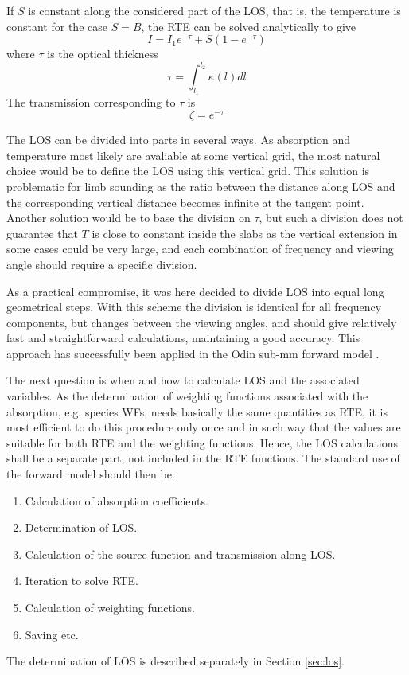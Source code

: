  If $S$ is constant along the considered part of the LOS, that is, the
 temperature is constant for the case $S=B$, the RTE can be solved
 analytically to give
 \begin{equation}
   I = I_1e^{-\tau} + S\left(1-e^{-\tau}\right)
  \label{eq:rte:step}
 \end{equation}
 where $\tau$ is the optical thickness
 \begin{equation}
   \tau = \int_{l_1}^{l_2}{\kappa(l)dl}
 \end{equation}
 The transmission corresponding to $\tau$ is
 \begin{equation}
   \zeta = e^{-\tau}
 \end{equation}  



 \label{sec:rte:practical}
 
 The LOS can be divided into parts in several ways. As absorption and
 temperature most likely are avaliable at some vertical grid, the most
 natural choice would be to define the LOS using this vertical grid.
 This solution is problematic for limb sounding as the ratio between
 the distance along LOS and the corresponding vertical distance
 becomes infinite at the tangent point. Another solution would be to
 base the division on $\tau$, but such a division does not guarantee
 that $T$ is close to constant inside the slabs as the vertical
 extension in some cases could be very large, and each combination of
 frequency and viewing angle should require a specific division.
  
 As a practical compromise, it was here decided to divide LOS into
 equal long geometrical steps. With this scheme the division is
 identical for all frequency components, but changes between the
 viewing angles, and should give relatively fast and straightforward
 calculations, maintaining a good accuracy. This approach has
 successfully been applied in the Odin sub-mm forward model 
 \citep{eriksson:97a,eriksson:00a}.
  
 The next question is when and how to calculate LOS and the associated
 variables. As the determination of weighting functions associated
 with the absorption, e.g. species WFs, needs basically the same
 quantities as RTE, it is most efficient to do this procedure only
 once and in such way that the values are suitable for both RTE and
 the weighting functions. Hence, the LOS calculations shall be a
 separate part, not included in the RTE functions. The standard use of
 the forward model should then be:
  \begin{enumerate}
    \item Calculation of absorption coefficients.
    \item Determination of LOS.
    \item Calculation of the source function and transmission along LOS.
    \item Iteration to solve RTE.
    \item Calculation of weighting functions.
    \item Saving etc.
  \end{enumerate}
 The determination of LOS is described separately in Section \ref {sec:los}. 
  

